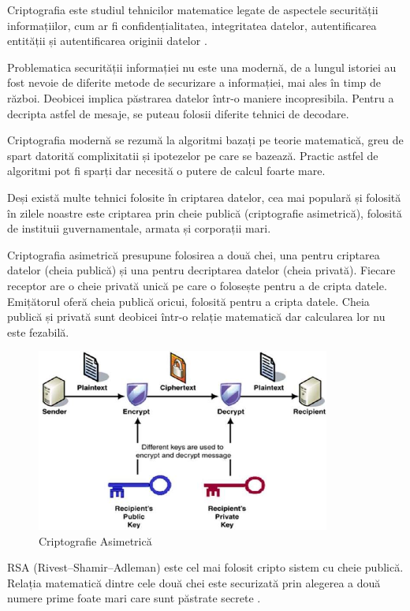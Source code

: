 \documentclass[12pt]{article}
\begin{document}
\bigskip

Criptografia este studiul tehnicilor matematice legate de aspectele 
securității informațiilor, cum ar fi confidențialitatea, integritatea datelor, 
autentificarea entității și autentificarea originii datelor \cite{katz1996handbook}.

Problematica securității informației nu este una modernă, de a lungul istoriei 
au fost nevoie de diferite metode de securizare a informației, mai ales în timp de război.
Deobicei implica păstrarea datelor într-o maniere incopresibila. Pentru a decripta
astfel de mesaje, se puteau folosii diferite tehnici de decodare.

Criptografia modernă se rezumă la algoritmi bazați pe teorie matematică, greu 
de spart datorită complixitatii și ipotezelor pe care se bazează. Practic astfel de
algoritmi pot fi sparți dar necesită o putere de calcul foarte mare.

Deși există multe tehnici folosite în criptarea datelor, cea mai populară și folosită
în zilele noastre este criptarea prin cheie publică (criptografie asimetrică), folosită
de instituii guvernamentale, armata și corporații mari.


Criptografia asimetrică presupune folosirea a două chei, una pentru criptarea datelor
(cheia publică) și una pentru decriptarea datelor (cheia privată). Fiecare receptor are o cheie privată unică pe care o folosește pentru a de cripta datele.
Emițătorul oferă cheia publică oricui, folosită pentru a cripta datele. Cheia publică și privată sunt deobicei într-o relație matematică dar calcularea lor
nu este fezabilă.

\begin{figure}[H]
    \centering
    \includegraphics[height=6cm]{public_key_cryptography.jpg}
    \caption{Criptografie Asimetrică \cite{tutrsa}}
    \end{figure}

RSA (Rivest–Shamir–Adleman) este cel mai folosit cripto sistem cu cheie publică. Relația matematică 
dintre cele două chei este securizată prin alegerea a două numere prime foate mari care sunt păstrate secrete \cite{barton2012regulation}.
\end{document}
